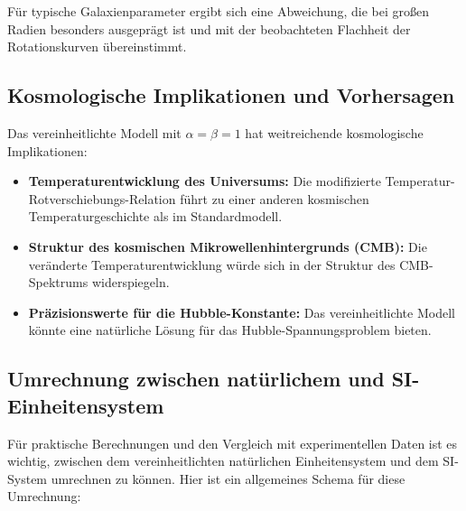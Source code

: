 \documentclass[12pt,a4paper]{article}
\begin{document}
	Für typische Galaxienparameter ergibt sich eine Abweichung, die bei großen Radien besonders ausgeprägt ist und mit der beobachteten Flachheit der Rotationskurven übereinstimmt.
	
	\subsection{Kosmologische Implikationen und Vorhersagen}
	
	Das vereinheitlichte Modell mit $\alpha = \beta = 1$ hat weitreichende kosmologische Implikationen:
	
	\begin{itemize}
		\item \textbf{Temperaturentwicklung des Universums:} Die modifizierte Temperatur-Rotverschiebungs-Relation führt zu einer anderen kosmischen Temperaturgeschichte als im Standardmodell.
		
		\item \textbf{Struktur des kosmischen Mikrowellenhintergrunds (CMB):} Die veränderte Temperaturentwicklung würde sich in der Struktur des CMB-Spektrums widerspiegeln.
		
		\item \textbf{Präzisionswerte für die Hubble-Konstante:} Das vereinheitlichte Modell könnte eine natürliche Lösung für das Hubble-Spannungsproblem bieten.
	\end{itemize}
	
	\subsection{Umrechnung zwischen natürlichem und SI-Einheitensystem}
	
	Für praktische Berechnungen und den Vergleich mit experimentellen Daten ist es wichtig, zwischen dem vereinheitlichten natürlichen Einheitensystem und dem SI-System umrechnen zu können. Hier ist ein allgemeines Schema für diese Umrechnung:
	
\end{document}
